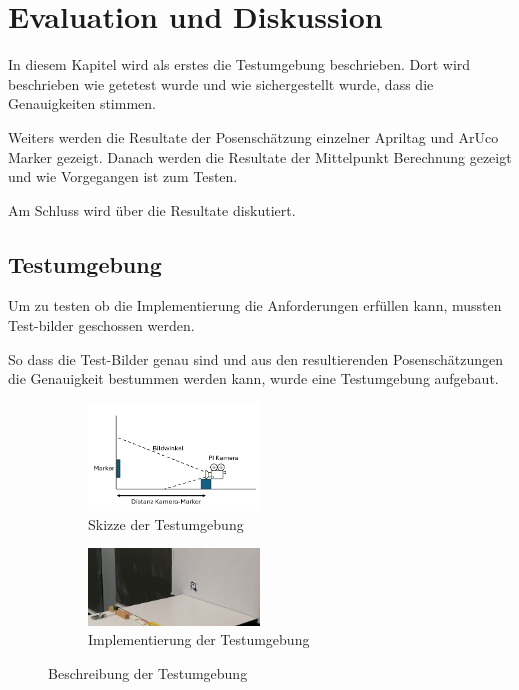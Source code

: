 \section{Evaluation und Diskussion}

In diesem Kapitel wird als erstes die Testumgebung beschrieben. 
Dort wird beschrieben wie getetest wurde und wie sichergestellt wurde, dass die Genauigkeiten stimmen.

Weiters werden die Resultate der Posenschätzung einzelner Apriltag und ArUco Marker gezeigt.
Danach werden die Resultate der Mittelpunkt Berechnung gezeigt und wie Vorgegangen ist zum Testen.

Am Schluss wird über die Resultate diskutiert.

\subsection{Testumgebung}

Um zu testen ob die Implementierung die Anforderungen erfüllen kann, mussten Test-bilder geschossen werden.

So dass die Test-Bilder genau sind und aus den resultierenden Posenschätzungen die Genauigkeit bestummen werden kann, wurde eine Testumgebung aufgebaut.

\begin{figure}[H]
    \centering
    \begin{subfigure}[h]{0.5\textwidth}
        \includegraphics[width=0.5\textwidth]{graphics/Skizze_TestUmgebung.PNG}\hfill%
        \caption{Skizze der Testumgebung}
        \label{fig:SkizzeTestumgebung}
    \end{subfigure}
    \quad
    \begin{subfigure}[h]{0.5\textwidth}
        \includegraphics[width=0.5\textwidth]{graphics/TestUmgebung.jpg}\hfill%
        \caption{Implementierung der Testumgebung}
        \label{fig:Testumgebung}
    \end{subfigure}
    \caption{Beschreibung der Testumgebung}
\end{figure}

